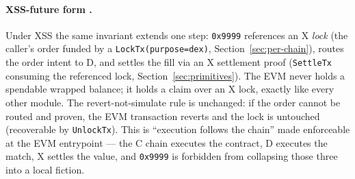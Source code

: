 \paragraph{XSS-future form \DESIGN{}.} Under XSS the same invariant
extends one step: \texttt{0x9999} references an X \emph{lock} (the
caller's order funded by a \texttt{LockTx(purpose=dex)},
Section~\ref{sec:per-chain}), routes the order intent to D, and settles
the fill via an X settlement proof (\texttt{SettleTx} consuming the
referenced lock, Section~\ref{sec:primitives}). The EVM never holds a
spendable wrapped balance; it holds a claim over an X lock, exactly like
every other module. The revert-not-simulate rule is unchanged: if the
order cannot be routed and proven, the EVM transaction reverts and the
lock is untouched (recoverable by \texttt{UnlockTx}). This is ``execution
follows the chain'' made enforceable at the EVM entrypoint --- the C
chain executes the contract, D executes the match, X settles the value,
and \texttt{0x9999} is forbidden from collapsing those three into a
local fiction.
